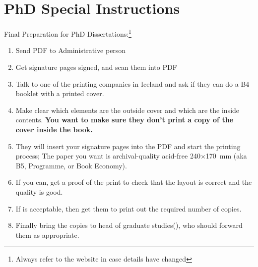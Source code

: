 \section{PhD Special Instructions}
Final Preparation for PhD Dissertations:\footnote{Always refer to the website in case details have changed}
\begin{enumerate}
\item Send PDF to Administrative person \TItvdadmin{}
\item Get signature pages signed, and scan them into PDF
\item Talk to one of the printing companies in Iceland and ask if they can do a B4 booklet with a printed cover.
\item Make clear which elements are the outside cover and which are the inside contents.
  \textbf{You want to make sure they don't print a copy of the cover inside the book.}
\item They will insert your signature pages into the PDF and start the printing process;
  The paper you want is archival-quality acid-free 240$\times$\SI{170}{\milli\meter} (aka B5, Programme, or Book Economy).
\item If you can, get a proof of the print to check that the layout is correct and the quality is good.
\item If is acceptable, then get them to print out the required number of copies.
\item Finally bring the copies to head of graduate studies(\TIheadofgrad{}), who should forward them as appropriate.

\end{enumerate}


%
%

\newpage
\appendix
